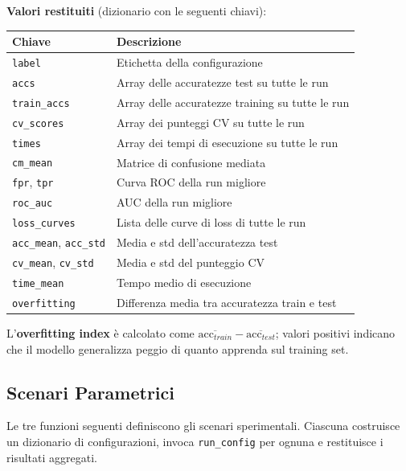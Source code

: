 \documentclass[11pt,a4paper]{article}
\begin{document}
\textbf{Valori restituiti} (dizionario con le seguenti chiavi):
\begin{center}
\begin{tabular}{ll}
\toprule
\textbf{Chiave} & \textbf{Descrizione} \\
\midrule
\texttt{label}       & Etichetta della configurazione \\
\texttt{accs}        & Array delle accuratezze test su tutte le run \\
\texttt{train\_accs} & Array delle accuratezze training su tutte le run \\
\texttt{cv\_scores}  & Array dei punteggi CV su tutte le run \\
\texttt{times}       & Array dei tempi di esecuzione su tutte le run \\
\texttt{cm\_mean}    & Matrice di confusione mediata \\
\texttt{fpr}, \texttt{tpr} & Curva ROC della run migliore \\
\texttt{roc\_auc}    & AUC della run migliore \\
\texttt{loss\_curves} & Lista delle curve di loss di tutte le run \\
\texttt{acc\_mean}, \texttt{acc\_std} & Media e std dell'accuratezza test \\
\texttt{cv\_mean}, \texttt{cv\_std}   & Media e std del punteggio CV \\
\texttt{time\_mean}  & Tempo medio di esecuzione \\
\texttt{overfitting} & Differenza media tra accuratezza train e test \\
\bottomrule
\end{tabular}
\end{center}

L'\textbf{overfitting index} è calcolato come
$\overline{\text{acc}_{train}} - \overline{\text{acc}_{test}}$;
valori positivi indicano che il modello generalizza peggio di quanto
apprenda sul training set.

\subsection{Scenari Parametrici}

Le tre funzioni seguenti definiscono gli scenari sperimentali. Ciascuna
costruisce un dizionario di configurazioni, invoca \texttt{run\_config}
per ognuna e restituisce i risultati aggregati.

\end{document}

